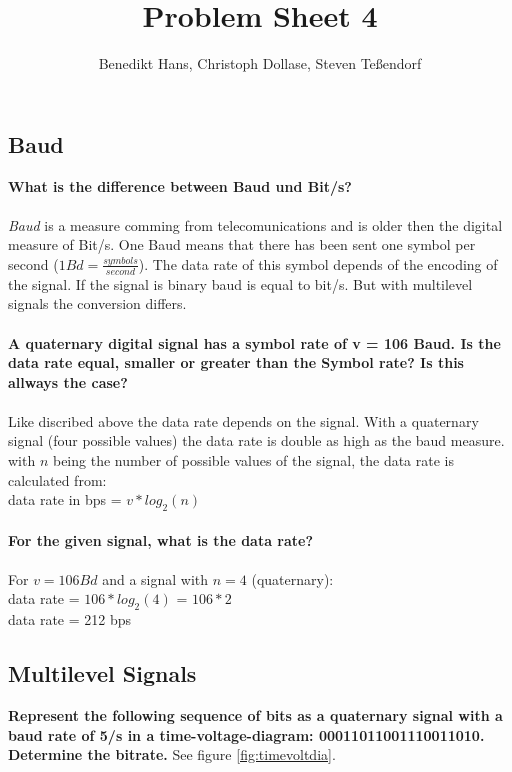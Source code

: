 \documentclass[a4paper,12pt]{article}
\author{Benedikt Hans, Christoph Dollase, Steven Te\ss endorf}
\title{ \textbf{Problem Sheet 4}} %
\begin{document}
	 
	\maketitle	 %
	
\subsection{Baud}
\textbf{What is the difference between Baud und Bit/s?}\\
\\
\textit{Baud} is a measure comming from telecomunications and is older then the digital measure of Bit/s.
One Baud means that there has been sent one symbol per second ($1Bd = \frac{symbols}{second}$). The data rate of this symbol depends of the encoding of the signal. If the signal is binary baud is equal to bit/s. But with multilevel signals the conversion differs.\\
\\
\textbf{A quaternary digital signal has a symbol rate of v = 106 Baud. Is the data rate equal,	smaller or greater than the Symbol rate? Is this allways the case?}\\
\\
Like discribed above the data rate depends on the signal. With a quaternary signal (four possible values) the data rate is double as high as the baud measure. \\
with $n$ being the number of possible values of the signal, the data rate is calculated from: \\
data rate in bps = $v * log_{2}(n)$ \\
\\ 
\textbf{For the given signal, what is the data rate?}\\
\\
For $v = 106 Bd$ and a signal with $n=4$ (quaternary):\\
data rate = $106 * log_{2}(4)$ = $106 * 2$ \\
data rate = 212 bps


\subsection{Multilevel Signals}
\textbf{Represent the following sequence of bits as a quaternary signal with a baud rate of 5/s in a time-voltage-diagram: 00011011001110011010. Determine the bitrate.} See figure \ref{fig:timevoltdia}.
\end{document}
